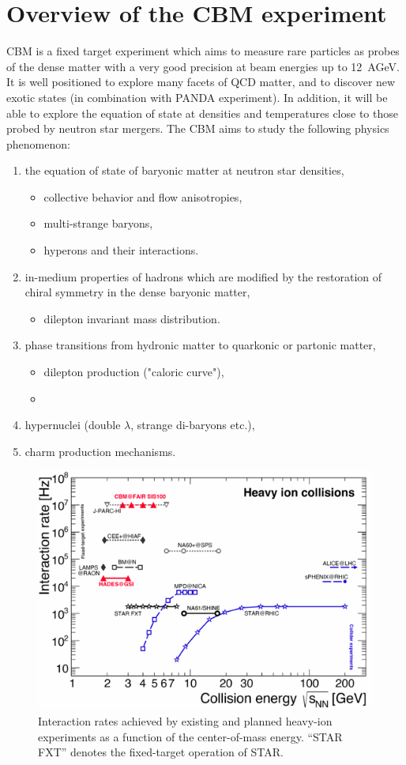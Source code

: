 
\section{Overview of the CBM experiment}
\gls{CBM} is a fixed target experiment which aims to measure rare particles as probes of the dense matter with a very good precision at beam energies up to 12~AGeV. It is well positioned to explore many facets of \gls{QCD} matter, and to discover new exotic states (in combination with \gls{PANDA} experiment). In addition, it will be able to explore the equation of state at densities and temperatures close to those probed by neutron star mergers. The \gls{CBM} aims to study the following physics phenomenon:
\begin{enumerate}
    \item the equation of state of baryonic matter at neutron star densities,
    \begin{itemize}
        \item collective behavior and flow anisotropies,
        \item multi-strange baryons,
        \item hyperons and their interactions.
    \end{itemize}
    \item in-medium properties of hadrons which are modified by the restoration of chiral symmetry in the dense baryonic matter, 
    \begin{itemize}
        \item dilepton invariant mass distribution.
    \end{itemize}
    \item phase transitions from hydronic matter to quarkonic or partonic matter,
    \begin{itemize}
        \item dilepton production ("caloric curve"),
        \item 
    \end{itemize}
    \item hypernuclei (double $\lambda$, strange di-baryons etc.),
    \item charm production mechanisms.
\end{enumerate}

\begin{figure}[!h]
    \centering
    \includegraphics[width=0.6\columnwidth]{Chapter1/images/interaction_rates.png}
    \caption{Interaction rates achieved by existing and planned heavy-ion experiments as a function of the center-of-mass energy. “STAR FXT” denotes the fixed-target operation of STAR. ~\cite{Ablyazimov_2017}}
    \label{fig:cbm_density}
\end{figure}


